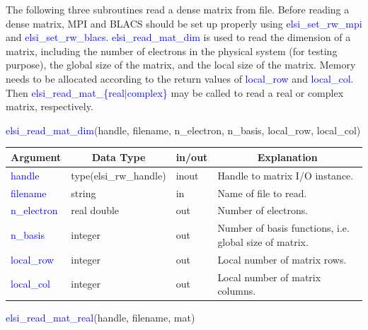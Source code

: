 \documentclass{report}
\newcommand{\tcb}[1]{\textcolor{blue}{#1}}
\begin{document}
The following three subroutines read a dense matrix from file. Before reading a dense matrix, MPI and BLACS should be set up properly using \tcb{elsi\_set\_rw\_mpi} and \tcb{elsi\_set\_rw\_blacs}. \tcb{elsi\_read\_mat\_dim} is used to read the dimension of a matrix, including the number of electrons in the physical system (for testing purpose), the global size of the matrix, and the local size of the matrix. Memory needs to be allocated according to the return values of \tcb{local\_row} and \tcb{local\_col}. Then \tcb{elsi\_read\_mat\_\{real$\vert$complex\}} may be called to read a real or complex matrix, respectively.
\begin{labeling}{\hspace{6cm}}
\item [\hspace{0.3cm} \tcb{elsi\_read\_mat\_dim}(handle, filename, n\_electron, n\_basis, local\_row, local\_col)]
\end{labeling}

\begin{tabular}[]{|p{20mm}|p{45mm}|p{15mm}|p{85mm}|}
\hline
\multicolumn{1}{|c|}{\textbf{Argument}} & \multicolumn{1}{c|}{\textbf{Data Type}} & \multicolumn{1}{c|}{\textbf{in/out}} & \multicolumn{1}{c|}{\textbf{Explanation}}\\
\hline
\tcb{handle}      & type(elsi\_rw\_handle) & inout & Handle to matrix I/O instance.\\
\hline
\tcb{filename}    & string                 & in    & Name of file to read.\\
\hline
\tcb{n\_electron} & real double            & out   & Number of electrons.\\
\hline
\tcb{n\_basis}    & integer                & out   & Number of basis functions, i.e. global size of matrix.\\
\hline
\tcb{local\_row}  & integer                & out   & Local number of matrix rows.\\
\hline
\tcb{local\_col}  & integer                & out   & Local number of matrix columns.\\
\hline
\end{tabular}

\begin{labeling}{\hspace{6cm}}
\item [\hspace{0.3cm} \tcb{elsi\_read\_mat\_real}(handle, filename, mat)]
\end{labeling}
\end{document}
